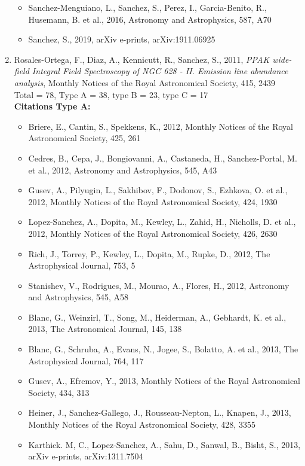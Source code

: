 \documentclass{letter}
\begin{document}
\begin{enumerate}
\begin{itemize}
\item Sanchez-Menguiano, L., Sanchez, S., Perez, I., Garcia-Benito, R., Husemann, B. et al., 2016, Astronomy and Astrophysics, 587, A70
\item Sanchez, S., 2019, arXiv e-prints, arXiv:1911.06925
\end{itemize}
\item Rosales-Ortega, F., Diaz, A., Kennicutt, R., Sanchez, S., 2011, {\it PPAK wide-field Integral Field Spectroscopy of NGC 628 - II. Emission line abundance analysis}, Monthly Notices of the Royal Astronomical Society, 415, 2439 \\ 
Total = 78, Type A = 38, type B = 23, type C = 17 \\ 
{\bf Citations Type A:}
\begin{itemize}
\item Briere, E., Cantin, S., Spekkens, K., 2012, Monthly Notices of the Royal Astronomical Society, 425, 261
\item Cedres, B., Cepa, J., Bongiovanni, A., Castaneda, H., Sanchez-Portal, M. et al., 2012, Astronomy and Astrophysics, 545, A43
\item Gusev, A., Pilyugin, L., Sakhibov, F., Dodonov, S., Ezhkova, O. et al., 2012, Monthly Notices of the Royal Astronomical Society, 424, 1930
\item Lopez-Sanchez, A., Dopita, M., Kewley, L., Zahid, H., Nicholls, D. et al., 2012, Monthly Notices of the Royal Astronomical Society, 426, 2630
\item Rich, J., Torrey, P., Kewley, L., Dopita, M., Rupke, D., 2012, The Astrophysical Journal, 753, 5
\item Stanishev, V., Rodrigues, M., Mourao, A., Flores, H., 2012, Astronomy and Astrophysics, 545, A58
\item Blanc, G., Weinzirl, T., Song, M., Heiderman, A., Gebhardt, K. et al., 2013, The Astronomical Journal, 145, 138
\item Blanc, G., Schruba, A., Evans, N., Jogee, S., Bolatto, A. et al., 2013, The Astrophysical Journal, 764, 117
\item Gusev, A., Efremov, Y., 2013, Monthly Notices of the Royal Astronomical Society, 434, 313
\item Heiner, J., Sanchez-Gallego, J., Rousseau-Nepton, L., Knapen, J., 2013, Monthly Notices of the Royal Astronomical Society, 428, 3355
\item Karthick. M, C., Lopez-Sanchez, A., Sahu, D., Sanwal, B., Bisht, S., 2013, arXiv e-prints, arXiv:1311.7504

\end{itemize}
\end{enumerate}
\end{document}
